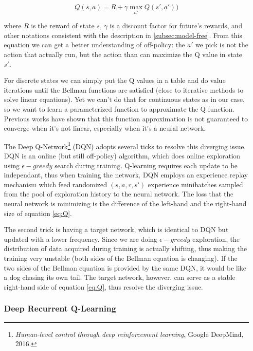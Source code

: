 \begin{equation}
\label{eq:Q}
    Q(s,a)= R+\gamma\max\limits_{a'}Q(s',a'))
\end{equation}

where $R$ is the reward of state $s$, $\gamma$ is a discount factor for future's rewards, and other notations consistent with the description in \ref{subsec:model-free}. From this equation we can get a better understanding of off-policy: the $a'$ we pick is not the action that actually run, but the action than can maximize the Q value in state $s'$.

For discrete states we can simply put the Q values in a table and do value iterations until the Bellman functions are satisfied (close to iterative methods to solve linear equations). Yet we can't do that for continuous states as in our case, so we want to learn a parameterized function to approximate the Q function. Previous works have shown that this function approximation is not guaranteed to converge when it's not linear, especially when it's a neural network.

The Deep Q-Network\footnote{\textit{Human-level control through deep reinforcement learning}, Google DeepMind, 2016.} (DQN) adopts several ticks to resolve this diverging issue. DQN is an online (but still off-policy) algorithm, which does online exploration using $\epsilon-greedy$ search during training. Q-learning requires each update to be independant, thus when training the network, DQN employs an experience replay mechanism which feed randomized $(s, a, r, s')$ experience minibatches sampled from the pool of exploration history to the neural network. The loss that the neural network is minimizing is the difference of the left-hand and the right-hand size of equation \ref{eq:Q}.

The second trick is having a target network, which is identical to DQN but updated with a lower frequency. Since we are doing $\epsilon-greedy$ exploration, the distribution of data acquired during training is actually shifting, thus making the training very unstable (both sides of the Bellman equation is changing). If the two sides of the Bellman equation is provided by the same DQN, it would be like a dog chasing its own tail. The target network, however, can serve as a stable right-hand side of equation \ref{eq:Q}, thus resolve the diverging issue.

\subsubsection{Deep Recurrent Q-Learning}

